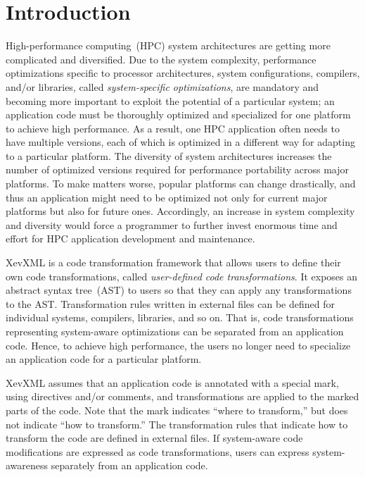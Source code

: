 \chapter{Introduction}\label{cap:intro}

High-performance computing~(HPC) system architectures are getting more
complicated and diversified. Due to the system complexity, performance
optimizations specific to processor architectures, system
configurations, compilers, and/or libraries, called
\emph{system-specific optimizations}, are mandatory and becoming more
important to exploit the potential of a particular system; an
application code must be thoroughly optimized and specialized for one
platform to achieve high performance.  As a result, one HPC application
often needs to have multiple versions, each of which is optimized in a
different way for adapting to a particular platform.  The diversity of
system architectures increases the number of optimized versions required
for performance portability across major platforms.  To make matters
worse, popular platforms can change drastically, and thus an application
might need to be optimized not only for current major platforms but also
for future ones.  Accordingly, an increase in system complexity and
diversity would force a programmer to further invest enormous time and
effort for HPC application development and maintenance.



XevXML is a code transformation framework that allows users to define
their own code transformations, called \emph{user-defined code
transformations}.  It exposes an abstract syntax tree~(AST) to users so
that they can apply any transformations to the AST. Transformation rules
written in external files can be defined for individual systems,
compilers, libraries, and so on.  That is, code transformations
representing system-aware optimizations can be separated from an
application code.  Hence, to achieve high performance, the users no
longer need to specialize an application code for a particular platform.

XevXML assumes that an application code is annotated with a special
mark, using directives and/or comments, and transformations are applied
to the marked parts of the code.  Note that the mark indicates ``where
to transform,'' but does not indicate ``how to transform.''  The
transformation rules that indicate how to transform the code are defined
in external files. If system-aware code modifications are expressed as
code transformations, users can express system-awareness separately from
an application code.

